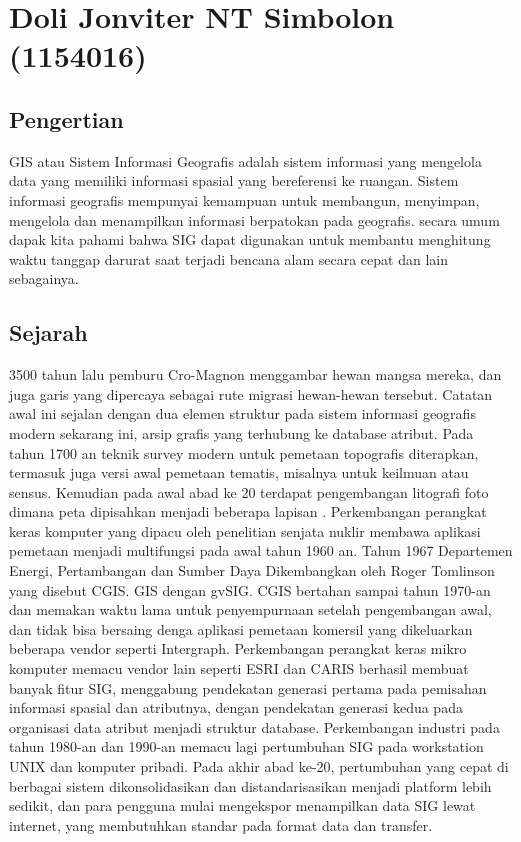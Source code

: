\section{Doli Jonviter NT Simbolon (1154016)}
\subsection{Pengertian}
GIS atau Sistem Informasi Geografis adalah sistem informasi yang mengelola data yang memiliki informasi spasial yang bereferensi ke ruangan. Sistem informasi geografis mempunyai kemampuan untuk membangun, menyimpan, mengelola dan menampilkan informasi berpatokan pada geografis. secara umum dapak kita pahami bahwa SIG dapat digunakan untuk membantu menghitung waktu tanggap darurat saat terjadi bencana alam secara cepat dan lain sebagainya.
\subsection{Sejarah}
3500 tahun lalu pemburu Cro-Magnon menggambar hewan mangsa mereka, dan juga garis yang dipercaya sebagai rute migrasi hewan-hewan tersebut. Catatan awal ini sejalan dengan dua elemen struktur pada sistem informasi geografis modern sekarang ini, arsip grafis yang terhubung ke database atribut.
Pada tahun 1700 an teknik survey modern untuk pemetaan topografis diterapkan, termasuk juga versi awal pemetaan tematis, misalnya untuk keilmuan atau sensus.
Kemudian pada awal abad ke 20 terdapat pengembangan litografi foto dimana peta dipisahkan menjadi beberapa lapisan . Perkembangan perangkat keras komputer yang dipacu oleh penelitian senjata nuklir membawa aplikasi pemetaan menjadi multifungsi pada awal tahun 1960 an.
Tahun 1967 Departemen Energi, Pertambangan dan Sumber Daya Dikembangkan oleh Roger Tomlinson yang disebut CGIS.
GIS dengan gvSIG. 
CGIS bertahan sampai tahun 1970-an dan memakan waktu lama untuk penyempurnaan setelah pengembangan awal, dan tidak bisa bersaing denga aplikasi pemetaan komersil yang dikeluarkan beberapa vendor seperti Intergraph. Perkembangan perangkat keras mikro komputer memacu vendor lain seperti ESRI dan CARIS berhasil membuat banyak fitur SIG, menggabung pendekatan generasi pertama pada pemisahan informasi spasial dan atributnya, dengan pendekatan generasi kedua pada organisasi data atribut menjadi struktur database. Perkembangan industri pada tahun 1980-an dan 1990-an memacu lagi pertumbuhan SIG pada workstation UNIX dan komputer pribadi. Pada akhir abad ke-20, pertumbuhan yang cepat di berbagai sistem dikonsolidasikan dan distandarisasikan menjadi platform lebih sedikit, dan para pengguna mulai mengekspor menampilkan data SIG lewat internet, yang membutuhkan standar pada format data dan transfer. 

